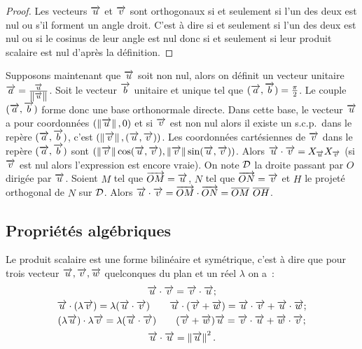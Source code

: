 \begin{proof}
    Les vecteurs \(\vu\) et \(\vv\) sont orthogonaux si et seulement si l'un des 
    deux est nul ou s'il forment un angle droit. C'est à dire si et seulement si 
    l'un des deux est nul ou si le cosinus de leur angle est nul donc si et 
    seulement si leur produit scalaire est nul d'après la définition.
\end{proof}

Supposons maintenant que \(\vu\) soit non nul, alors on définit un vecteur 
unitaire \(\vect{a} = \frac{\vu}{\norme{\vu}}\). Soit le vecteur \(\vect{b}\) 
unitaire et unique tel que \((\vect{a},\vect{b}) = \frac{\pi}{2}\). Le couple 
\((\vect{a},\vect{b})\) forme donc une base orthonormale directe. Dans cette 
base, le vecteur \(\vu\) a pour coordonnées \((\norme{\vu},0)\) et si \(\vv\) 
est non nul alors il existe un s.c.p.\ dans le repère \((\vect{a},\vect{b})\), 
c'est \((\norme{\vv}, (\vu , \vv))\). Les coordonnées cartésiennes de \(\vv\) dans 
le repère \((\vect{a},\vect{b})\) sont 
\((\norme{\vv}\cos(\vu , \vv),\norme{\vv}\sin(\vu , \vv))\). Alors \(\vu \cdot \vv = 
X_{\vu}X_{\vv}\) (si \(\vv\) est nul alors l'expression est encore vraie).  On 
note \(\Dr\) la droite passant par \(O\) dirigée par \(\vu\). Soient \(M\) tel 
que \(\vect{OM} = \vu\), \(N\) tel que \(\vect{ON} = \vv\) et \(H\) le projeté 
orthogonal de \(N\) sur \(\Dr\). Alors \(\vu \cdot \vv = \vect{OM} \cdot 
\vect{ON}= \overline{OM}~\overline{OH}\).

\subsection{Propriétés algébriques}

\begin{prop}
    Le produit scalaire est une forme bilinéaire et symétrique, c'est à dire que 
    pour trois vecteur \(\vu, \vv, \vw\) quelconques du plan et un réel 
    \(\lambda\) on a~:
    \begin{gather}
        \vu \cdot \vv = \vv \cdot \vu;\\
        \vu \cdot (\lambda \vv) = \lambda (\vu\cdot \vv) \qquad \vu \cdot (\vv + 
        \vw) = \vu \cdot \vv + \vu \cdot \vw;\\
        (\lambda \vu) \cdot \lambda \vv = \lambda (\vu \cdot \vv) \qquad (\vv + 
        \vw) \vu = \vv \cdot \vu + \vw \cdot \vv;\\
        \vu \cdot \vu = \norme{\vu}^2.
    \end{gather}
\end{prop}

